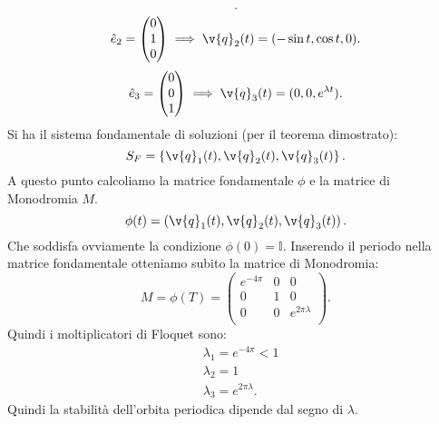 \begin{exmp}[]
\[    .\] 
    \[
	\hat{e}_2 = \begin{pmatrix} 0 \\ 1 \\ 0 \end{pmatrix} \implies  \v{q}_2(t) = (-\sin t, \cos t, 0)
    .\] 
    \[
	\hat{e}_3 = \begin{pmatrix} 0 \\ 0 \\ 1 \end{pmatrix} \implies  \v{q}_3(t) = (0, 0, e^{\lambda t})
    .\] 
    Si ha il sistema fondamentale di soluzioni (per il teorema dimostrato):
    \[
	S_F = \left\{\v{q }_1(t) , \v{q }_2(t) , \v{q }_3(t) \right\}
    .\] 
    A questo punto calcoliamo la matrice fondamentale $\phi$ e la matrice di Monodromia $M$. 
    \[
	\phi (t) = \left(\v{q }_1(t) , \v{q }_2(t) , \v{q }_3(t)\right)
    .\] 
    Che soddisfa ovviamente la condizione $\phi (0) = \mathbb{I}$. Inserendo il periodo nella matrice fondamentale otteniamo subito la matrice di Monodromia:
    \[
	M = \phi (T) = 
\begin{pmatrix}
    e^{-4\pi} & 0 & 0 \\
    0 & 1 & 0 \\
    0 & 0 & e^{2\pi\lambda} \\
\end{pmatrix}
    .\] 
    Quindi i moltiplicatori di Floquet sono:
    \[\begin{aligned}
        & \lambda_1 = e^{-4\pi}<1\\
	& \lambda_2=1\\
	& \lambda_3=e^{2\pi\lambda}
    .\end{aligned}\]
    Quindi la stabilità dell'orbita periodica dipende dal segno di $\lambda$. 
\end{exmp}
\noindent
